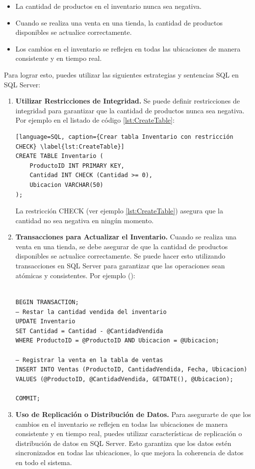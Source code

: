 \begin{itemize}
	\item La cantidad de productos en el inventario nunca sea negativa.
	\item Cuando se realiza una venta en una tienda, la cantidad de productos disponibles se actualice correctamente.
	\item Los cambios en el inventario se reflejen en todas las ubicaciones de manera consistente y en tiempo real.
\end{itemize}
Para lograr esto, puedes utilizar las siguientes estrategias y sentencias SQL en SQL Server:

\begin{enumerate}
	\item \textbf{Utilizar Restricciones de Integridad.} Se puede definir restricciones de integridad para garantizar que la cantidad de productos nunca sea negativa. Por ejemplo en el listado de código \ref{lst:CreateTable}:
	
	\begin{lstlisting}[language=SQL, caption={Crear tabla Inventario con restricción CHECK} \label{lst:CreateTable}]
CREATE TABLE Inventario (
	ProductoID INT PRIMARY KEY,
	Cantidad INT CHECK (Cantidad >= 0),
	Ubicacion VARCHAR(50)
);
	\end{lstlisting}
	
	La restricción CHECK (ver ejemplo \ref{lst:CreateTable}) asegura que la cantidad no sea negativa en ningún momento.
	\item \textbf{Transacciones para Actualizar el Inventario.} Cuando se realiza una venta en una tienda, se debe asegurar de que la cantidad de productos disponibles se actualice correctamente. Se puede hacer esto utilizando transacciones en SQL Server para garantizar que las operaciones sean atómicas y consistentes. Por ejemplo (\label{eje:ConCohe}):
	
	\texttt{\\BEGIN TRANSACTION;\\
		-- Restar la cantidad vendida del inventario\\
		UPDATE Inventario\\
		SET Cantidad = Cantidad - @CantidadVendida\\
		WHERE ProductoID = @ProductoID AND Ubicacion = @Ubicacion;\\ \\
		-- Registrar la venta en la tabla de ventas\\
		INSERT INTO Ventas (ProductoID, CantidadVendida, Fecha, Ubicacion) \\
		VALUES (@ProductoID, @CantidadVendida, GETDATE(), @Ubicacion);\\ \\
		COMMIT;
	}
	\item \textbf{Uso de Replicación o Distribución de Datos.} Para asegurarte de que los cambios en el inventario se reflejen en todas las ubicaciones de manera consistente y en tiempo real, puedes utilizar características de replicación o distribución de datos en SQL Server. Esto garantiza que los datos estén sincronizados en todas las ubicaciones, lo que mejora la coherencia de datos en todo el sistema.
\end{enumerate}

